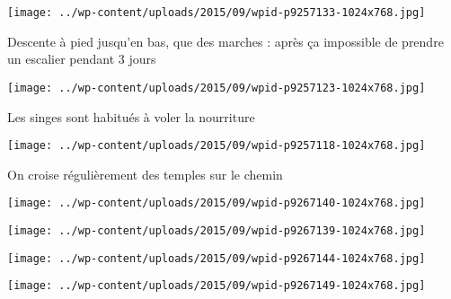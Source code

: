  

\begin{center} \texttt{[image: ../wp-content/uploads/2015/09/wpid-p9257133-1024x768.jpg]} \end{center}

 

 Descente à pied jusqu'en bas, que des marches : après ça impossible de prendre un escalier pendant 3 jours 

 

\begin{center} \texttt{[image: ../wp-content/uploads/2015/09/wpid-p9257123-1024x768.jpg]} \end{center}

 

 Les singes sont habitués à voler la nourriture 

 

\begin{center} \texttt{[image: ../wp-content/uploads/2015/09/wpid-p9257118-1024x768.jpg]} \end{center}

 

 On croise régulièrement des temples sur le chemin 

 

\begin{center} \texttt{[image: ../wp-content/uploads/2015/09/wpid-p9267140-1024x768.jpg]} \end{center}

 

 

\begin{center} \texttt{[image: ../wp-content/uploads/2015/09/wpid-p9267139-1024x768.jpg]} \end{center}

 

 

\begin{center} \texttt{[image: ../wp-content/uploads/2015/09/wpid-p9267144-1024x768.jpg]} \end{center}

 

 

\begin{center} \texttt{[image: ../wp-content/uploads/2015/09/wpid-p9267149-1024x768.jpg]} \end{center}

 

